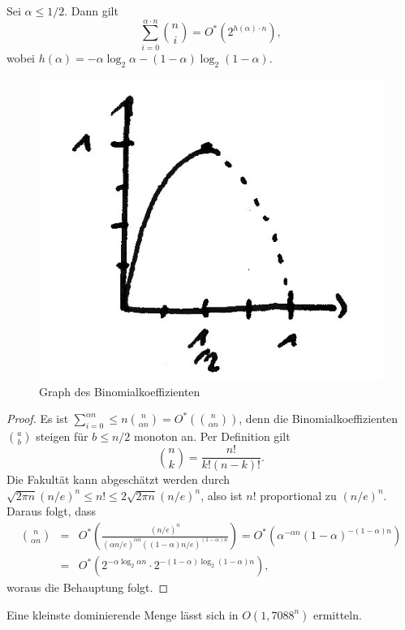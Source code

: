   
  \begin{lemma}
    Sei \(\alpha \leq 1/2\). Dann gilt \[ \sum_{i=0}^{\alpha \cdot n} \binom{n}{i} = O^*( 2^{h(\alpha) \cdot n} ), \] wobei \(h(\alpha) = - \alpha \log_2 \alpha - (1-\alpha) \log_2(1 - \alpha)\).
  \end{lemma}
  
  \begin{figure}[h]
    \centering
    \includegraphics[width=.25\textwidth]{./Bilder/b01.jpg}
    \caption{Graph des Binomialkoeffizienten}
  \end{figure}
  
  \begin{proof}
    Es ist \( \sum_{i=0}^{\alpha n} \leq n \binom{n}{\alpha n} = O^*( \binom{n}{\alpha n} ) \), denn die Binomialkoeffizienten \( \binom{a}{b} \) steigen für \(b \leq n/2\) monoton an. Per Definition gilt 
    \[
      \binom{n}{k} = \frac{n!}{k! (n-k)!}.
    \]
    Die Fakultät kann abgeschätzt werden durch \( \sqrt{2 \pi n} (n/e)^n \leq n! \leq 2 \sqrt{2 \pi n} (n/e)^n \), also ist \(n!\) proportional zu \((n/e)^n\). Daraus folgt, dass 
    \begin{eqnarray*}
      \binom{n}{\alpha n} &=& O^* \left( \frac{(n/e)^n}{(\alpha n/e)^{\alpha n} ( (1-\alpha)n/e)^{(1-\alpha) n}} \right) = O^* \left( \alpha^{-\alpha n} (1-\alpha)^{-(1-\alpha)n} \right) \\
      &=& O^* \left( 2^{-\alpha \log_2 \alpha n} \cdot 2^{-(1 - \alpha) \log_2(1-\alpha)n} \right),
    \end{eqnarray*}
    woraus die Behauptung folgt.
  \end{proof}
  
  \begin{theorem}
    Eine kleinste dominierende Menge lässt sich in \(O(1{,}7088^n)\) ermitteln.
  \end{theorem}
  
